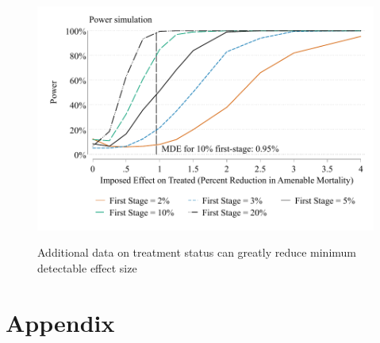 \documentclass[12pt]{article}%
\begin{document}
   \begin{figure}[H]
    \caption{Additional data on treatment status can greatly reduce minimum detectable effect size}
      \includegraphics[width=\linewidth]{../output/figures/power_known_first_stage_ddd_ln_amen_55_64_cluster_state_weight_attpop_split_controls_yes_preperiod_2001_2010_first_stage.pdf}
       \label{fig:subgroup_firststage}
    \end{figure}
\clearpage
\newpage


\FloatBarrier
\section*{Appendix}


\setcounter{page}{1}

\renewcommand*{\thepage}{A\arabic{page}}

\setcounter{table}{0}
\setcounter{figure}{0}
\setcounter{section}{0}
\setcounter{subsection}{0}

\renewcommand{\thetable}{A\arabic{table}}
\renewcommand{\thefigure}{A\arabic{figure}}
\renewcommand{\thesection}{A.\arabic{section}}
\renewcommand{\thesubsection}{A.\arabic{subsection}}

\FloatBarrier
\end{document}
